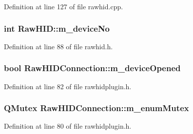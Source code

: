 \-Definition at line 127 of file rawhid.\-cpp.

\hypertarget{group___raw_h_i_d_plugin_ga0dde2d900a5f9cbd059e528de3f0c73b}{
\subsubsection[{m\-\_\-device\-No}]{\setlength{\rightskip}{0pt plus 5cm}int {\bf \-Raw\-H\-I\-D\-::m\-\_\-device\-No}}}\label{group___raw_h_i_d_plugin_ga0dde2d900a5f9cbd059e528de3f0c73b}


\-Definition at line 88 of file rawhid.\-h.

\hypertarget{group___raw_h_i_d_plugin_ga043f346d34d71eb80f1e33ab78a82286}{
\subsubsection[{m\-\_\-device\-Opened}]{\setlength{\rightskip}{0pt plus 5cm}bool {\bf \-Raw\-H\-I\-D\-Connection\-::m\-\_\-device\-Opened}}}\label{group___raw_h_i_d_plugin_ga043f346d34d71eb80f1e33ab78a82286}


\-Definition at line 82 of file rawhidplugin.\-h.

\hypertarget{group___raw_h_i_d_plugin_ga13d9bdfab2ab9e3a4f4cd08b53a2f105}{
\subsubsection[{m\-\_\-enum\-Mutex}]{\setlength{\rightskip}{0pt plus 5cm}\-Q\-Mutex {\bf \-Raw\-H\-I\-D\-Connection\-::m\-\_\-enum\-Mutex}}}\label{group___raw_h_i_d_plugin_ga13d9bdfab2ab9e3a4f4cd08b53a2f105}


\-Definition at line 80 of file rawhidplugin.\-h.

